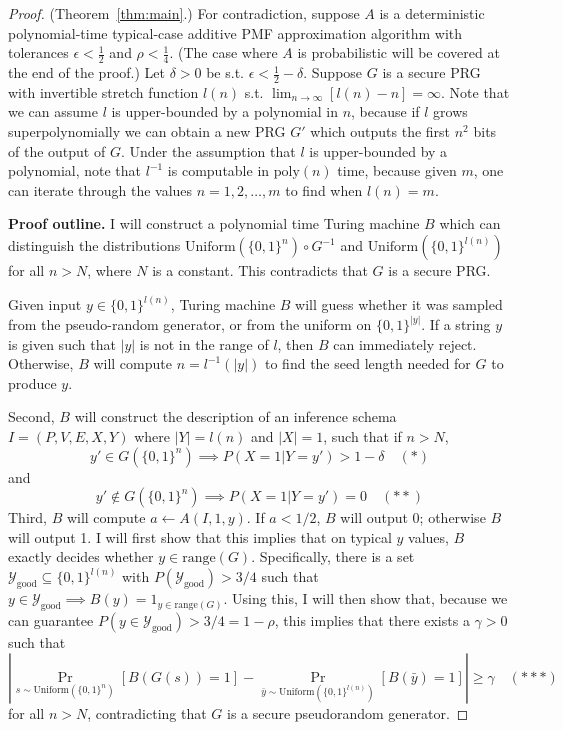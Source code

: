\documentclass{article}
\def \Ygood{\mathcal{Y}_\text{good}}
\def \by{{\bar{y}}}
\theoremstyle{definition}
\theoremstyle{remark}
\begin{document}
\begin{proof}{(Theorem~\ref{thm:main}.)}
For contradiction, suppose $A$ is a deterministic polynomial-time typical-case additive PMF approximation algorithm with tolerances $\epsilon < \frac{1}{2}$ and $\rho < \frac{1}{4}$.
(The case where $A$ is probabilistic will be covered at the end of the proof.)
Let $\delta > 0$ be s.t. $\epsilon < \frac{1}{2} - \delta$.
Suppose $G$ is a secure PRG with invertible stretch function $l(n)$ s.t. $\lim_{n \to \infty} [l(n) - n] = \infty$.
Note that we can assume $l$ is upper-bounded by a polynomial in $n$, because if $l$ grows superpolynomially we can obtain a new PRG $G'$ which outputs the first $n^2$ bits of the output of $G$.
Under the assumption that $l$ is upper-bounded by a polynomial, note that $l^{-1}$ is computable in $\text{poly}(n)$ time, because given $m$, one can iterate through the values $n = 1, 2, \dots, m$ to find when $l(n) = m$.

\medskip
\noindent \textbf{Proof outline.}
I will construct a polynomial time Turing machine $B$ which can distinguish the distributions $\text{Uniform}(\{0, 1\}^n) \circ G^{-1}$ and $\text{Uniform}(\{0, 1\}^{l(n)})$ for all $n > N$, where $N$ is a constant.  This contradicts that $G$ is a secure PRG.

Given input $y \in \{0, 1\}^{l(n)}$,
Turing machine $B$ will guess whether it was sampled from the pseudo-random generator, or from the uniform on $\{0, 1\}^{|y|}$.
If a string $y$ is given such that $|y|$ is not in the range of $l$, then $B$ can immediately reject.
Otherwise, $B$ will compute $n = l^{-1}(|y|)$ to find the seed length needed for $G$ to produce $y$.

Second, $B$ will construct the description of an inference schema $I = (P, V, E, X, Y)$ where $|Y| = l(n)$ and $|X| = 1$, such that if $n > N$,
$$
y' \in G(\{0, 1\}^n) \implies P(X = 1 | Y = y') > 1 - \delta \quad (*)
$$
and
$$
y' \notin G(\{0, 1\}^n) \implies P(X = 1 | Y = y') = 0 \quad (**)
$$
Third, $B$ will compute $a \gets A(I, 1, y)$.
If $a < 1/2$, $B$ will output 0; otherwise $B$ will output 1.
I will first show that this implies that on typical $y$ values,
$B$ exactly decides whether $y \in \text{range}(G)$.
Specifically, there is a set $\Ygood \subseteq \{0, 1\}^{l(n)}$ with $P(\Ygood) > 3/4$ such that
$y \in \Ygood \implies B(y) = 1_{y \in \text{range}(G)}$.
Using this,
I will then show that, because we can guarantee $P(y \in \Ygood) > 3/4 = 1 - \rho$,
this implies that there exists a $\gamma > 0$ such that
$$
|\Pr_{s \sim \text{Uniform}(\{0, 1\}^n)}[B(G(s)) = 1] - \Pr_{\by \sim \text{Uniform}(\{0, 1\}^{l(n)})}[B(\by) = 1]| \geq \gamma \quad (***)
$$
for all $n > N$, contradicting that $G$ is a secure pseudorandom generator.


\end{proof}
\end{document}

